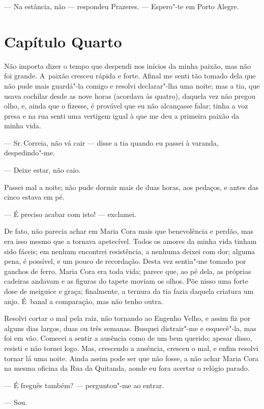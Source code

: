 \begin{linenumbers}
--- Na estância, não --- respondeu Prazeres. --- Espero"-te em Porto Alegre.

\section{Capítulo Quarto}

Não importa dizer o tempo que despendi nos inícios da minha paixão, mas
não foi grande. A~paixão cresceu rápida e forte. Afinal me senti tão
tomado dela que não pude mais guardá"-la comigo e resolvi declarar"-lha
uma noite; mas a tia, que usava cochilar desde as nove horas (acordava
às quatro), daquela vez não pregou olho, e, ainda que o fizesse, é
provável que eu não alcançasse falar; tinha a voz presa e na rua senti
uma vertigem igual à que me deu a primeira paixão da minha vida.

--- Sr.\,Correia, não vá cair --- disse a tia quando eu passei à varanda,
despedindo"-me.

--- Deixe estar, não caio.

Passei mal a noite; não pude dormir mais de duas horas, aos pedaços, e
antes das cinco estava em pé.

--- É preciso acabar com isto! --- exclamei.

De fato, não parecia achar em Maria Cora mais que benevolência e perdão,
mas era isso mesmo que a tornava apetecível. Todos os amores da minha
vida tinham sido fáceis; em nenhum encontrei resistência, a nenhuma
deixei com dor; alguma pena, é possível, e um pouco de recordação. Desta
vez sentia"-me tomado por ganchos de ferro. Maria Cora era toda vida;
parece que, ao pé dela, as próprias cadeiras andavam e as figuras do
tapete moviam os olhos. Põe nisso uma forte dose de meiguice e graça;
finalmente, a ternura da tia fazia daquela criatura um anjo. É~banal a
comparação, mas não tenho outra.

Resolvi cortar o mal pela raiz, não tornando ao Engenho Velho, e assim
fiz por alguns dias largos, duas ou três semanas. Busquei distrair"-me e
esquecê"-la, mas foi em vão. Comecei a sentir a ausência como de um bem
querido; apesar disso, resisti e não tornei logo. Mas, crescendo a
ausência, cresceu o mal, e enfim resolvi tornar lá uma noite. Ainda
assim pode ser que não fosse, a não achar Maria Cora na mesma oficina da
Rua da Quitanda, aonde eu fora acertar o relógio parado.

--- É freguês também? --- perguntou"-me ao entrar.

--- Sou.


\end{linenumbers}
